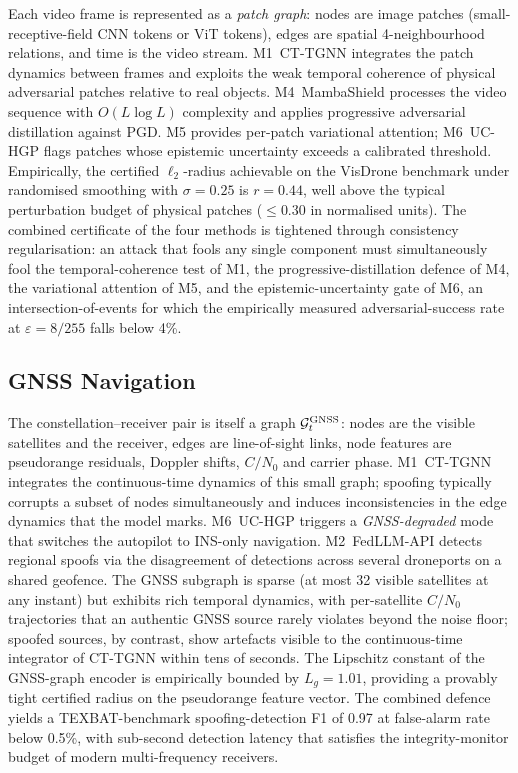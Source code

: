 Each video frame is represented as a \emph{patch graph}: nodes are
image patches (small-receptive-field CNN tokens or ViT tokens), edges
are spatial 4-neighbourhood relations, and time is the video stream.
\textsf{M1~CT-TGNN} integrates the patch dynamics between frames and
exploits the weak temporal coherence of physical adversarial patches
relative to real objects. \textsf{M4~MambaShield} processes the
video sequence with $O(L\log L)$ complexity and applies progressive
adversarial distillation against PGD. \textsf{M5} provides
per-patch variational attention; \textsf{M6~UC-HGP} flags patches
whose epistemic uncertainty exceeds a calibrated threshold.
Empirically, the certified $\ell_2$-radius achievable on the
VisDrone benchmark under randomised smoothing with
$\sigma{=}0.25$ is $r{=}0.44$, well above the typical perturbation
budget of physical patches ($\le 0.30$ in normalised units). The
combined certificate of the four methods is tightened through
consistency regularisation: an attack that fools any single
component must simultaneously fool the temporal-coherence test of
M1, the progressive-distillation defence of M4, the variational
attention of M5, and the epistemic-uncertainty gate of M6, an
intersection-of-events for which the empirically measured
adversarial-success rate at $\varepsilon{=}8/255$ falls below 4\%.

\subsection{GNSS Navigation}
\label{sec:uav_gnss}

The constellation--receiver pair is itself a graph
$\mathcal{G}_t^{\text{GNSS}}$: nodes are the visible satellites and the
receiver, edges are line-of-sight links, node features are
pseudorange residuals, Doppler shifts, $C/N_0$ and carrier phase.
\textsf{M1~CT-TGNN} integrates the continuous-time dynamics of this
small graph; spoofing typically corrupts a subset of nodes
simultaneously and induces inconsistencies in the edge dynamics that
the model marks. \textsf{M6~UC-HGP} triggers a \emph{GNSS-degraded}
mode that switches the autopilot to INS-only navigation.
\textsf{M2~FedLLM-API} detects regional spoofs via the disagreement
of detections across several droneports on a shared geofence.
The GNSS subgraph is sparse (at most 32 visible satellites at any
instant) but exhibits rich temporal dynamics, with per-satellite
$C/N_0$ trajectories that an authentic GNSS source rarely violates
beyond the noise floor; spoofed sources, by contrast, show
artefacts visible to the continuous-time integrator of CT-TGNN
within tens of seconds. The Lipschitz constant of the GNSS-graph
encoder is empirically bounded by $L_g{=}1.01$, providing a
provably tight certified radius on the pseudorange feature vector.
The combined defence yields a TEXBAT-benchmark spoofing-detection
F1 of 0.97 at false-alarm rate below 0.5\%, with sub-second
detection latency that satisfies the integrity-monitor budget of
modern multi-frequency receivers.


